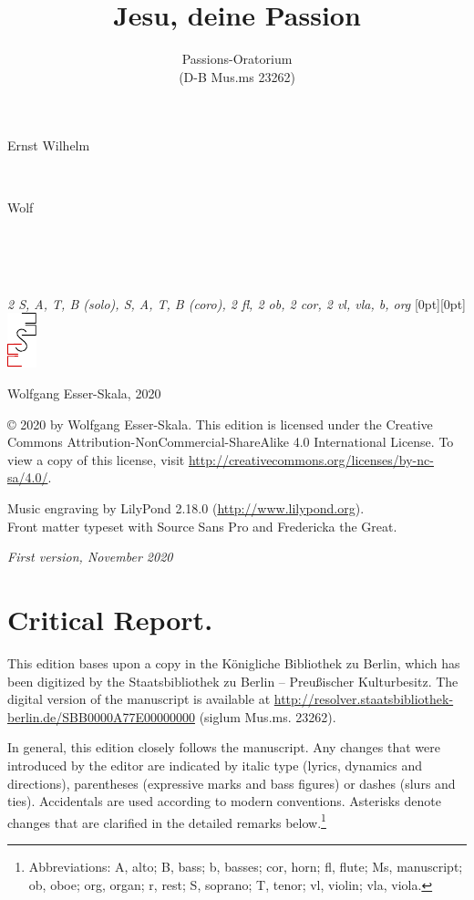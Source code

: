 \documentclass[parskip=full]{scrreprt}
\makeatletter
\DeclareRobustCommand{\sbseries}{\fontseries{sb}\selectfont}
\newcommand\fancytitlehead{
	\headingfont%
	\fontsize{80}{80}\selectfont\textcolor{black!80}{\@ifundefined{@shortname}{\@lastname}{\@shortname}.}\\[15pt]%
	\fontsize{55}{55}\selectfont\@ifundefined{@shorttitle}{\@title}{\@shorttitle}.%
}
\def\firstname#1{\def\@firstname{#1}}
\def\lastname#1{\def\@lastname{#1}}
\def\instrumentation#1{\def\@instrumentation{#1}}
\def\maketitle{%
\begin{titlepage}%
	\Large%
	{\@titlehead}%
	\vfill%
	{\strut\@firstname}\\%
	{\sbseries\color{oldred}\strut\@lastname}\\%
	{\strut\@namesuffix}%
	\vfill%
	{\sbseries\@title}\\%
	{\@subtitle}\\[\baselineskip]%
	{\itshape\@instrumentation}%
	\vfill%
	{\itshape\@parts}\hspace*{\fill}\raisebox{0pt}[0pt][0pt]{\includegraphics{ees_logo}}%
\end{titlepage}%
}
\newif\ifprintreport\printreportfalse
\makeatother
\begin{document}
\frenchspacing

\titlehead{\fancytitlehead}
\firstname{Ernst Wilhelm}
\lastname{Wolf}
\title{Jesu, deine Passion}
\subtitle{Passions-Oratorium\\(D-B Mus.ms 23262)}
\instrumentation{2 S, A, T, B (solo), S, A, T, B (coro), 2 fl, 2 ob, 2 cor, 2 vl, vla, b, org}
\maketitle


\thispagestyle{empty}

\vspace*{\fill}

\hspace*{1em}Wolfgang Esser-Skala, 2020

© 2020 by Wolfgang Esser-Skala. This edition is licensed under the Creative Commons Attribution-NonCommercial-ShareAlike 4.0 International License. To view a copy of this license, visit \url{http://creativecommons.org/licenses/by-nc-sa/4.0/}.

Music engraving by LilyPond 2.18.0 (\url{http://www.lilypond.org}).\\
Front matter typeset with Source Sans Pro and Fredericka the Great.

\textit{First version, November 2020}

\vspace*{2cm}

\ifprintreport
\chapter*{Critical Report.}

This edition bases upon a copy in the Königliche Bibliothek zu Berlin, which has been digitized by the Staatsbibliothek zu Berlin – Preußischer Kulturbesitz. The digital version of the manuscript is available at \url{http://resolver.staatsbibliothek-berlin.de/SBB0000A77E00000000} (siglum Mus.ms. 23262).

In general, this edition closely follows the manuscript. Any changes that were introduced by the editor are indicated by italic type (lyrics, dynamics and directions), parentheses (expressive marks and bass figures) or dashes (slurs and ties). Accidentals are used according to modern conventions. Asterisks denote changes that are clarified in the detailed remarks below.\footnote{Abbreviations: A, alto; B, bass; b, basses; cor, horn; fl, flute; Ms, manuscript; ob, oboe; org, organ; r, rest; S, soprano; T, tenor; vl, violin; vla, viola.}
\end{document}

